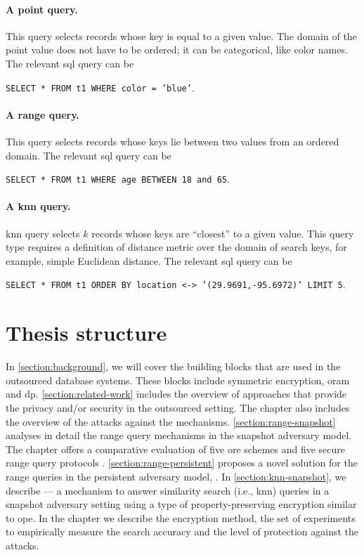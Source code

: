 			\paragraph*{A point query.}
				This query selects records whose key is equal to a given value.
				The domain of the point value does not have to be ordered; it can be categorical, like color names.
				The relevant \acrshort{sql} query can be

				\texttt{SELECT * FROM t1 WHERE color = 'blue'}. %

			\paragraph*{A range query.}
				This query selects records whose keys lie between two values from an ordered domain.
				The relevant \acrshort{sql} query can be

				\texttt{SELECT * FROM t1 WHERE age BETWEEN 18 and 65}.

			\paragraph*{A \acrshort{knn} query.}
				\acrlong{knn} query selects $k$ records whose keys are ``closest'' to a given value.
				This query type requires a definition of distance metric over the domain of search keys, for example, simple Euclidean distance.
				The relevant \acrshort{sql} query can be

				\texttt{SELECT * FROM t1 ORDER BY location <-> '(29.9691,-95.6972)' LIMIT 5}. %

	\section{Thesis structure}

		In \cref{section:background}, we will cover the building blocks that are used in the outsourced database systems.
		These blocks include symmetric encryption, \acrshort{oram} and \acrlong{dp}.
		\cref{section:related-work} includes the overview of approaches that provide the privacy and/or security in the outsourced setting.
		The chapter also includes the overview of the attacks against the mechanisms.
		\cref{section:range-snapshot} analyses in detail the range query mechanisms in the snapshot adversary model.
		The chapter offers a comparative evaluation of five \acrlong{ore} schemes and five secure range query protocols \cite{ore-benchmark-17}.
		\cref{section:range-persistent} proposes a novel solution for the range queries in the persistent adversary model, \epsolute{} \cite{ore-benchmark-17}.
		In \cref{section:knn-snapshot}, we describe \kanon{} \cite{k-anon} --- a mechanism to answer similarity search (i.e., \acrlong{knn}) queries in a snapshot adversary setting using a type of property-preserving encryption similar to \acrshort{ope}.
		In the chapter we describe the encryption method, the set of experiments to empirically measure the search accuracy and the level of protection against the attacks.

